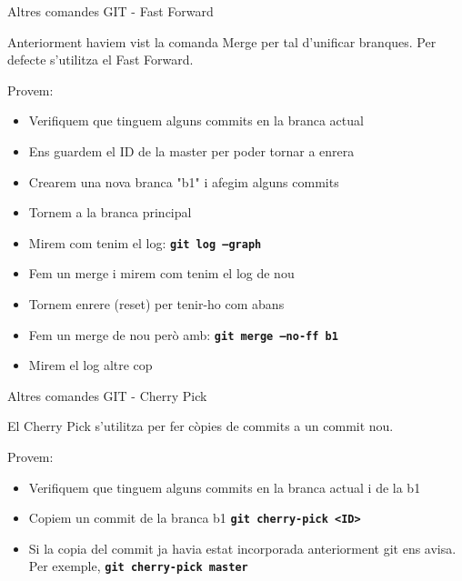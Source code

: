 \documentclass[10pt,xcolor={rgb}]{beamer}
\begin{document}
    \begin{frame}[fragile]{Altres comandes GIT - Fast Forward}

      Anteriorment haviem vist la comanda Merge per tal d'unificar branques.  Per defecte s'utilitza el Fast Forward.
      \begin{block}{Provem:}
      \begin{itemize}
        \item Verifiquem que tinguem alguns commits en la branca actual
        \item Ens guardem el ID de la master per poder tornar a enrera
        \item Crearem una nova branca "b1" i afegim alguns commits
        \item Tornem a la branca principal
        \item Mirem com tenim el log: \texttt{\textbf{git log --graph}}
        \item Fem un merge i mirem com tenim el log de nou
        \item Tornem enrere (reset) per tenir-ho com abans
        \item Fem un merge de nou però amb: \texttt{\textbf{git merge --no-ff b1}}
        \item Mirem el log altre cop
      \end{itemize}
      \end{block}
    \end{frame}

    \begin{frame}[fragile]{Altres comandes GIT - Cherry Pick}

      El Cherry Pick s'utilitza per fer còpies de commits a un commit nou.
      \begin{block}{Provem:}
      \begin{itemize}
        \item Verifiquem que tinguem alguns commits en la branca actual i de la b1
        \item Copiem un commit de la branca b1 \texttt{\textbf{git cherry-pick <ID>}}
        \item Si la copia del commit ja havia estat incorporada anteriorment git ens avisa.  Per exemple, \texttt{\textbf{git cherry-pick master}}
      \end{itemize}
      \end{block}
    \end{frame}
\end{document}
